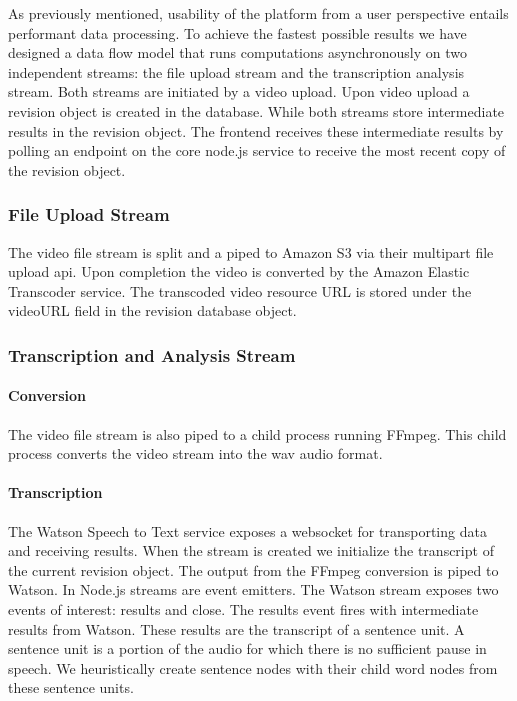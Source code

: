 As previously mentioned, usability of the platform from a user perspective
entails performant data processing. To achieve the fastest possible results we
have designed a data flow model that runs computations asynchronously on two
independent streams: the file upload stream and the transcription analysis
stream. Both streams are initiated by a video upload. Upon video upload a
revision object is created in the database. While both streams store
intermediate results in the revision object. The frontend receives these
intermediate results by polling an endpoint on the core node.js service to
receive the most recent copy of the revision object.


\subsubsection*{File Upload Stream}

The video file stream is split and a piped to Amazon S3 via their multipart file
upload api. Upon completion the video is converted by the Amazon Elastic
Transcoder service. The transcoded video resource URL is stored under the
videoURL field in the revision database object.

\subsubsection*{Transcription and Analysis Stream}

\paragraph{Conversion}
The video file stream is also piped to a child process running FFmpeg. This
child process converts the video stream into the wav audio format.

\paragraph{Transcription}
The Watson Speech to Text service exposes a websocket for transporting data and
receiving results. When the stream is created we initialize the transcript of
the current revision object. The output from the FFmpeg conversion is piped to
Watson. In Node.js streams are event emitters. The Watson stream exposes two
events of interest: results and close. The results event fires with intermediate
results from Watson. These results are the transcript of a sentence unit. A
sentence unit is a portion of the audio for which there is no sufficient pause
in speech. We heuristically create sentence nodes with their child word nodes
from these sentence units.

